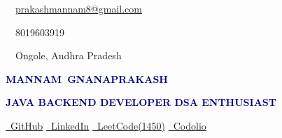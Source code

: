 \documentclass[a4paper]{article}
\begin{document}
\noindent
\begin{minipage}[t]{75mm}
    \vspace*{12pt}
    \hspace*{8mm}%
    \begin{minipage}[t]{60mm}
        \raggedright
        \small
        \vspace{2pt}
        {\color{navy}\faEnvelope}~~\href{mailto:prakashmannam8@gmail.com}{\small prakashmannam8@gmail.com}\par
        \vspace{2.5pt}
        {\color{navy}\faPhone}~~{\small 8019603919}\par
        \vspace{2.5pt}
        {\color{navy}\faMapMarker*}~~{\small Ongole, Andhra Pradesh}\par
    \end{minipage}
\end{minipage}%
\begin{minipage}[t]{135mm}
    \vspace*{12pt}
    \hspace*{6mm}%
    \begin{minipage}[t]{123mm}

        {\fontsize{24}{28}\selectfont\bfseries
        \textcolor{navy}{MANNAM~GNANAPRAKASH}}\par

        \vspace{3pt}

        {\large\bfseries\textcolor{navy}{%
        JAVA BACKEND DEVELOPER%
        \quad{\color{rulecolor}|}\quad
        DSA ENTHUSIAST%
        }}\par

        \vspace{4pt}

        {\small\color{muted}%
        \href{https://github.com/PrakashMannam}{\color{navy}\faGithub~GitHub}%
        \quad{\color{rulecolor}|}\quad
        \href{https://www.linkedin.com/in/prakash-mannam-19326b374}{\color{navy}\faLinkedin~LinkedIn}%
        \quad{\color{rulecolor}|}\quad
        \href{https://leetcode.com/u/prakash_mannam/}{\color{navy}\faCode~LeetCode\;(1450)}%
        \quad{\color{rulecolor}|}\quad
        \href{https://codolio.com/profile/Prakash\%20Mannam1}{\color{navy}\faCode~Codolio}%
        }\par

    \end{minipage}
\end{minipage}
\end{document}
